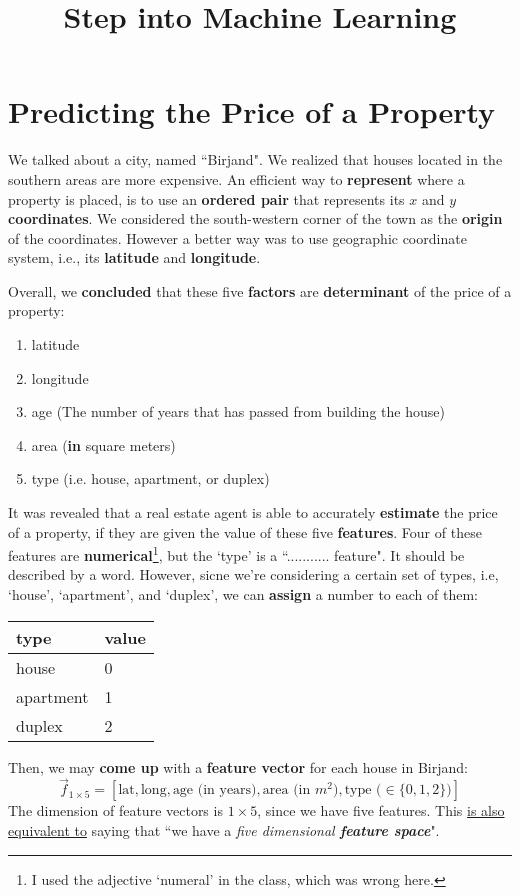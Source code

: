 \documentclass{article}
\begin{document}
\title{Step into Machine Learning}
\date{}
\maketitle
\section{Predicting the Price of a Property}
We talked about a city, named ``Birjand". We realized that houses located in the southern areas are more expensive. An efficient way to \textbf{represent} where a property is placed, is to use an \textbf{ordered pair} that represents its $x$ and $y$ \textbf{coordinates}. We considered the south-western corner of the town as the \textbf{origin} of the coordinates. However a better way was to use geographic coordinate system, i.e., its \textbf{latitude} and \textbf{longitude}.

Overall, we \textbf{concluded} that these five \textbf{factors} are \textbf{determinant} of the price of a property:
\begin{enumerate}
\item latitude
\item longitude
\item age (The number of years that has passed from building the house)
\item area (\textbf{in} square meters)
\item type (i.e. house, apartment, or duplex)
\end{enumerate} 
It was revealed that a real estate agent is able to accurately \textbf{estimate} the price of a property, if they are given the value of these five \textbf{features}. Four of these features are \textbf{numerical}\footnote{I used the adjective `numeral' in the class, which was {\color{red} wrong} here.}, but the `type' is a ``........... feature". It should be described by a word. However, sicne we're considering a certain set of types, i.e, `house', `apartment', and `duplex', we can \textbf{assign} a number to each of them:
\begin{tabular}{l|l}
type&value\\
\hline
house&0\\
apartment&1\\
duplex&2\\
\end{tabular}

\noindent Then, we may \textbf{come up} with a \textbf{feature vector} for each house in Birjand:
\begin{equation}
\vec{f}_{1\times 5} = [\text{lat}, \text{long}, \text{age (in years)}, \text{area (in } m^2 \text{)}, \text{type (} \in \{0, 1, 2\} \text{)}]
\label{eq:feactor}
\end{equation}
The dimension of feature vectors is $1\times 5$, since we have five features. This \underline{is also equivalent to} saying that ``we have a \emph{five dimensional \textbf{feature space}}".
\end{document}
